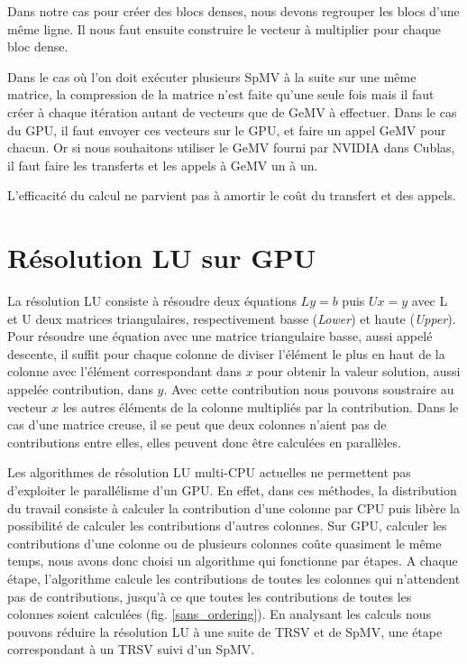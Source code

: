 \documentclass[a4paper,11pt]{report}
\begin{document}
  Dans notre cas pour créer des blocs denses, nous devons regrouper les
  blocs d'une même ligne. Il nous faut ensuite construire le vecteur à
  multiplier pour chaque bloc dense.

  Dans le cas où l'on doit exécuter plusieurs SpMV à la suite sur
  une même matrice, la compression de la matrice n'est
  faite qu'une seule fois mais il faut créer à chaque itération autant de
  vecteurs que de GeMV à effectuer. Dans le cas du GPU, il faut
  envoyer ces vecteurs sur le GPU, et faire un appel GeMV pour
  chacun. Or si nous souhaitons utiliser le GeMV fourni par NVIDIA
  dans Cublas, il faut faire les transferts et les appels à GeMV un à
  un.
  
  L'efficacité du calcul ne parvient pas à amortir le coût du
  transfert et des appels.

\chapter{Résolution LU sur GPU}
 La résolution LU consiste à résoudre deux équations $Ly=b$ puis $Ux=y$
 avec L et U deux matrices triangulaires, respectivement basse (\textit{Lower})
 et haute (\textit{Upper}). Pour résoudre une équation avec une matrice
 triangulaire basse, aussi appelé descente, il suffit pour chaque colonne
 de diviser l'élément le plus en haut de la colonne avec l'élément
 correspondant dans $x$ pour obtenir la valeur solution, aussi appelée
 contribution, dans $y$. Avec cette
 contribution nous pouvons soustraire au vecteur $x$ les autres éléments de la colonne
 multipliés par la contribution. Dans le cas d'une matrice creuse, il se
 peut que deux colonnes n'aient pas de contributions entre elles, elles
 peuvent donc être calculées en parallèles.
 
 Les algorithmes de résolution LU multi-CPU actuelles ne permettent pas
 d'exploiter le parallélisme d'un GPU. En effet, dans ces méthodes, la
 distribution du travail consiste à calculer la contribution d'une
 colonne par CPU puis
 libère la possibilité de calculer les contributions d'autres
 colonnes. Sur GPU, calculer les contributions d'une
 colonne ou de plusieurs colonnes coûte quasiment le même temps, nous
 avons donc choisi un algorithme qui fonctionne par étapes. A chaque
 étape, l'algorithme calcule les contributions de toutes les colonnes
 qui n'attendent pas de contributions, jusqu'à ce que toutes les
 contributions de toutes les colonnes soient calculées (fig. \ref{sans_ordering}). En analysant les
 calculs nous pouvons réduire la résolution LU à une suite de TRSV et
 de SpMV, une étape correspondant à un TRSV suivi d'un SpMV.
\end{document}
